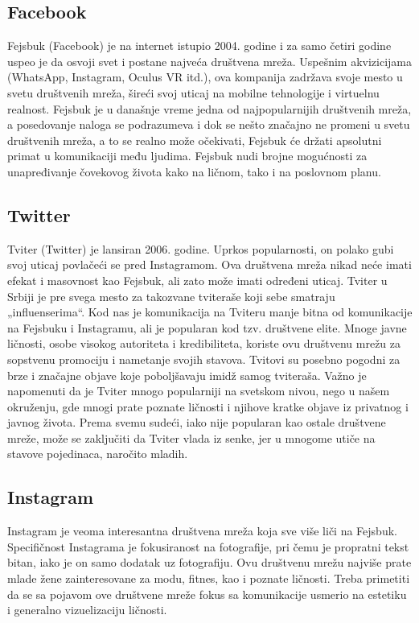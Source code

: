 \documentclass[a4paper]{article}
\begin{document}
{		\subsection{Facebook}
		\label{subsec:podnaslov1}
		Fejsbuk (Facebook) je na internet istupio 2004. godine i za samo četiri godine uspeo je da osvoji svet i postane najveća društvena mreža. Uspešnim akvizicijama (WhatsApp, Instagram, Oculus VR itd.), ova kompanija zadržava svoje mesto u svetu društvenih mreža, šireći svoj uticaj na mobilne tehnologije i virtuelnu realnost. Fejsbuk je u današnje vreme jedna od najpopularnijih društvenih mreža, a posedovanje naloga se podrazumeva i dok se nešto značajno ne promeni u svetu društvenih mreža, a to se realno može očekivati, Fejsbuk će držati apsolutni primat u komunikaciji među ljudima. Fejsbuk nudi brojne mogućnosti za unapređivanje čovekovog života kako na ličnom, tako i na poslovnom planu.
		\subsection{Twitter}
		\label{subsec:podnaslov2}
		Tviter (Twitter) je lansiran 2006. godine. Uprkos popularnosti, on polako gubi svoj uticaj povlačeći se pred Instagramom. Ova društvena mreža nikad neće imati efekat i masovnost kao Fejsbuk, ali zato može imati određeni uticaj. Tviter u Srbiji je pre svega mesto za takozvane tviteraše koji sebe smatraju „influenserima“. Kod nas je komunikacija na Tviteru manje bitna od komunikacije na Fejsbuku i Instagramu, ali je popularan kod tzv. društvene elite. Mnoge javne ličnosti, osobe visokog autoriteta i kredibiliteta, koriste ovu društvenu mrežu za sopstvenu promociju i nametanje svojih stavova. Tvitovi su posebno pogodni za brze i značajne objave koje poboljšavaju imidž samog tviteraša. Važno je napomenuti da je Tviter mnogo popularniji na svetskom nivou, nego u našem okruženju, gde mnogi prate poznate ličnosti i njihove kratke objave iz privatnog i javnog života. Prema svemu sudeći, iako nije popularan kao ostale društvene mreže, može se zaključiti da Tviter vlada iz senke, jer u mnogome utiče na stavove pojedinaca, naročito mladih.
		\subsection{Instagram}
		\label{subsec:podnaslov3}
		Instagram je veoma interesantna društvena mreža koja sve više liči na Fejsbuk. Specifičnost Instagrama je fokusiranost na fotografije, pri čemu je propratni tekst bitan, iako je on samo dodatak uz fotografiju. Ovu društvenu mrežu najviše prate mlade žene zainteresovane za modu, fitnes, kao i poznate ličnosti. Treba primetiti da se sa pojavom ove društvene mreže fokus sa komunikacije usmerio na estetiku i generalno vizuelizaciju ličnosti.
}
\end{document}
